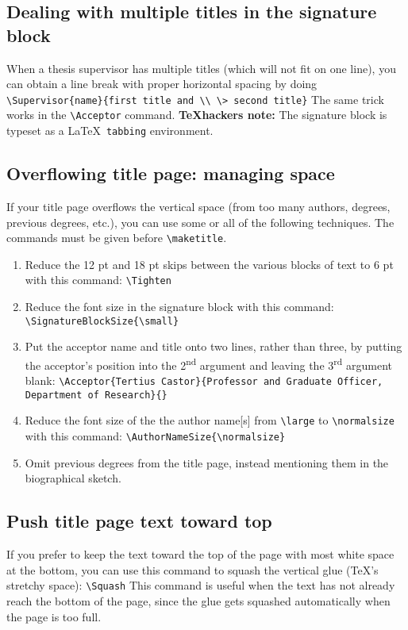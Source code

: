 \documentclass[11pt]{article}
\begin{document}
\subsection{Dealing with multiple titles in the signature block}\label{sec:6.3}
When a thesis supervisor has multiple titles (which will not fit on one line), you can obtain a line break with proper horizontal spacing by doing
	\vskip 5pt
	\quad\verb|\Supervisor{name}{first title and \\ \> second title}|
	\vskip 5pt
\noindent The same trick works in the \verb|\Acceptor| command.
\textbf{\TeX hackers note:} The signature block is typeset as a \LaTeX\ \texttt{tabbing} environment.

\subsection{Overflowing title page: managing space} If your title page overflows the vertical space (from too many authors, degrees, previous degrees, etc.), you can use some or all of the following techniques. The commands must be given before \verb|\maketitle|.
\begin{enumerate}
 \item Reduce the 12 pt and 18 pt skips between the various blocks of text to 6 pt with this command:
	\vskip 5pt
	\noindent\verb|\Tighten|
 \item Reduce the font size in the signature block with this command:
	\vskip 5pt
	\noindent\verb|\SignatureBlockSize{\small}| 
 \item Put the acceptor name and title onto two lines, rather than three, by putting the acceptor's position into the 2\textsuperscript{nd} argument and leaving the 3\textsuperscript{rd} argument blank:
	\vskip 5pt
	{\small\noindent\verb|\Acceptor{Tertius Castor}{Professor and Graduate Officer, Department of Research}{}|}
 \item Reduce the font size of the the author name[s] from \verb|\large| to \verb|\normalsize| with this command:
	\vskip 5pt
	\noindent\verb|\AuthorNameSize{\normalsize}|
 \item Omit previous degrees from the title page, instead mentioning them in the biographical sketch.
\end{enumerate}


\subsection{Push title page text toward top} If you prefer to keep the text toward the top of the page with most white space at the bottom, you
can use this command to squash the vertical glue (\TeX's stretchy space):
	\vskip 5pt
	\quad\verb|\Squash| 
	\vskip 5pt
\noindent This command is useful when the text has not already reach the bottom of the page, since the glue gets squashed automatically when the page is too full.
\end{document}
